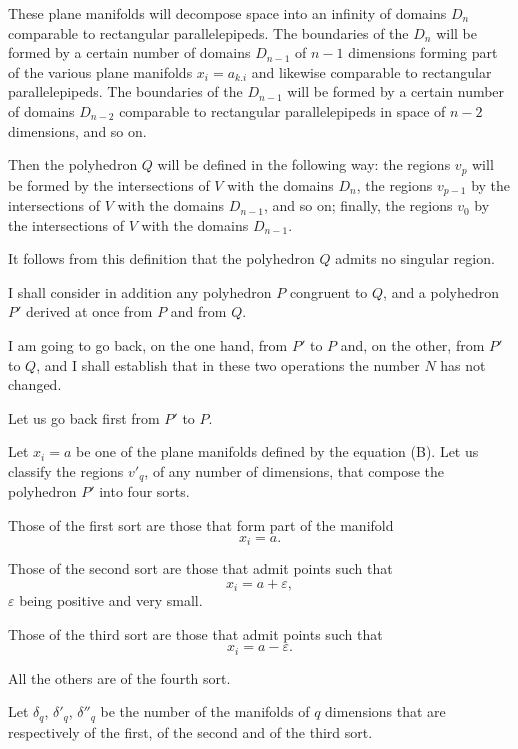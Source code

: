 \documentclass{article}
\begin{document}
These plane manifolds will decompose space into an infinity of domains $D_{n}$ comparable to rectangular parallelepipeds. The boundaries of the $D_{n}$ will be formed by a certain number of domains $D_{n-1}$ of $n - 1$ dimensions forming part of the various plane manifolds $x_{i} = a_{k.i}$ and likewise comparable to rectangular parallelepipeds. The boundaries of the $D_{n-1}$ will be formed by a certain number of domains $D_{n-2}$ comparable to rectangular parallelepipeds in space of $n - 2$ dimensions, and so on.

Then the polyhedron $Q$ will be defined in the following way: the regions $v_{p}$ will be formed by the intersections of $V$ with the domains $D_{n}$, the regions $v_{p-1}$ by the intersections of $V$ with the domains $D_{n-1}$, and so on; finally, the regions $v_{0}$ by the intersections of $V$ with the domains $D_{n-1}$.

It follows from this definition that the polyhedron $Q$ admits no singular region.

I shall consider in addition any polyhedron $P$ congruent to $Q$, and a polyhedron $P'$ derived at once from $P$ and from $Q$.

I am going to go back, on the one hand, from $P'$ to $P$ and, on the other, from $P'$ to $Q$, and I shall establish that in these two operations the number $N$ has not changed.

Let us go back first from $P'$ to $P$.

Let $x_{i} = a$ be one of the plane manifolds defined by the equation (B). Let us classify the regions $v'_{q}$, of any number of dimensions, that compose the polyhedron $P'$ into four sorts.

Those of the first sort are those that form part of the manifold
\[ x_{i} = a. \]

Those of the second sort are those that admit points such that
\[ x_{i} = a + \varepsilon, \]
$\varepsilon$ being positive and very small.

Those of the third sort are those that admit points such that
\[ x_{i} = a - \varepsilon. \]

All the others are of the fourth sort.

Let $\delta_{q}$, $\delta'_{q}$, $\delta''_{q}$ be the number of the manifolds of $q$ dimensions that are respectively of the first, of the second and of the third sort.
\end{document}

